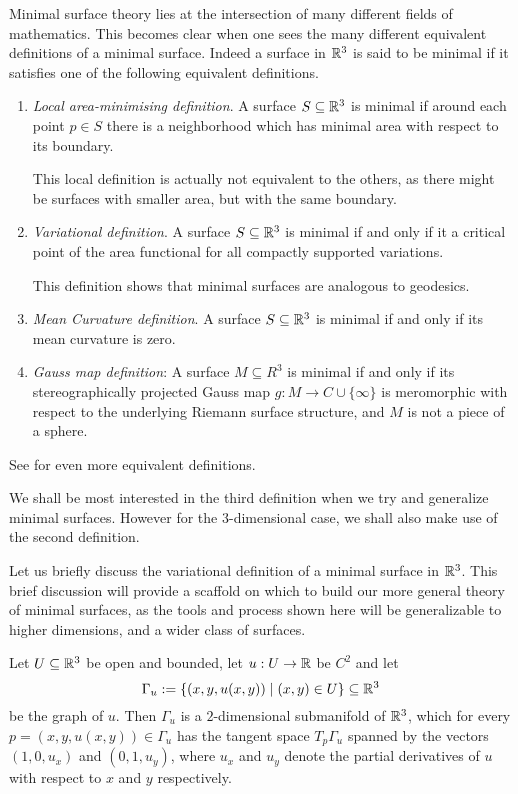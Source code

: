 Minimal surface theory lies at the intersection of many different fields of mathematics. This becomes clear when one sees the many different equivalent definitions of a minimal surface. Indeed a surface in $\mathbb{R}^3$ is said to be minimal if it satisfies one of the following equivalent definitions.
\begin{enumerate}
    \item \emph{Local area-minimising definition}. A surface $S \subseteq \mathbb{R}^3$ is minimal if around each point $p \in S$ there is a neighborhood which has minimal area with respect to its boundary. \cite{holopainen15}
    
    This local definition is actually not equivalent to the others, as there might be surfaces with smaller area, but with the same boundary.
    \item \emph{Variational definition}. A surface $S \subseteq \mathbb{R}^3$ is minimal if and only if it a critical point of the area functional for all compactly supported variations.
    
    This definition shows that minimal surfaces are analogous to geodesics. \cite{holopainen15}
    
    \item \emph{Mean Curvature definition}. A surface $S \subseteq \mathbb{R}^3$ is minimal if and only if its mean curvature is zero. \cite{holopainen15}
    
    \item \emph{Gauss map definition}: A surface $M \subseteq R^3$ is minimal if and only if its stereographically projected Gauss map $g: M \to C \cup \{ \infty \}$ is meromorphic with respect to the underlying Riemann surface structure, and $M$ is not a piece of a sphere.\cite{holopainen15}
\end{enumerate}
See \cite{holopainen15} for even more equivalent definitions.

We shall be most interested in the third definition when we try and generalize minimal surfaces. However for the 3-dimensional case, we shall also make use of the second definition.

Let us briefly discuss the variational definition of a minimal surface in $\mathbb{R}^3$. This brief discussion will provide a scaffold on which to build our more general theory of minimal surfaces, as the tools and process shown here will be generalizable to higher dimensions, and a wider class of surfaces.

Let $U \subseteq \mathbb{R}^3$ be open and bounded, let $u:U \to \mathbb{R}$ be $C^2$ and let
\[
    \Gamma_u:=\{(x,y,u(x,y)) \mid (x,y) \in U\} \subseteq \mathbb{R}^3
\]
be the graph of $u$.
Then $\Gamma_u$ is a $2$-dimensional submanifold of $\mathbb{R}^3$, which for every $p=(x,y,u(x,y))\in \Gamma_u$ has the tangent space $T_p\Gamma_u$ spanned by the vectors $(1,0,u_x)$ and $(0,1,u_y)$, where $u_x$ and $u_y$ denote the partial derivatives of $u$ with respect to $x$ and $y$ respectively.

